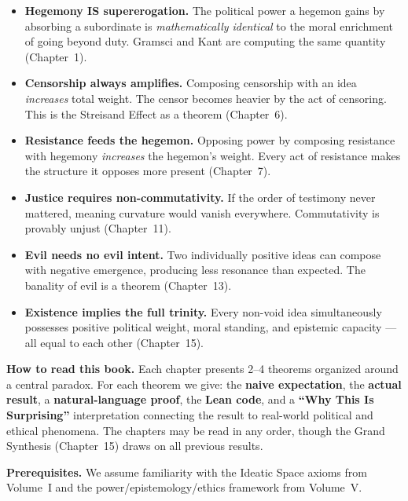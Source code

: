 \documentclass[11pt,openany]{book}
\theoremstyle{definition}
\theoremstyle{plain}
\theoremstyle{remark}
\begin{document}
\begin{itemize}
\item \textbf{Hegemony IS supererogation.} The political power a hegemon gains by absorbing a subordinate is \emph{mathematically identical} to the moral enrichment of going beyond duty.  Gramsci and Kant are computing the same quantity (Chapter~1).

\item \textbf{Censorship always amplifies.}  Composing censorship with an idea \emph{increases} total weight.  The censor becomes heavier by the act of censoring.  This is the Streisand Effect as a theorem (Chapter~6).

\item \textbf{Resistance feeds the hegemon.}  Opposing power by composing resistance with hegemony \emph{increases} the hegemon's weight.  Every act of resistance makes the structure it opposes more present (Chapter~7).

\item \textbf{Justice requires non-commutativity.}  If the order of testimony never mattered, meaning curvature would vanish everywhere.  Commutativity is provably unjust (Chapter~11).

\item \textbf{Evil needs no evil intent.}  Two individually positive ideas can compose with negative emergence, producing less resonance than expected.  The banality of evil is a theorem (Chapter~13).

\item \textbf{Existence implies the full trinity.}  Every non-void idea simultaneously possesses positive political weight, moral standing, and epistemic capacity --- all equal to each other (Chapter~15).
\end{itemize}

\noindent\textbf{How to read this book.} Each chapter presents 2--4 theorems organized around a central paradox.  For each theorem we give: the \textbf{naive expectation}, the \textbf{actual result}, a \textbf{natural-language proof}, the \textbf{Lean code}, and a \textbf{``Why This Is Surprising''} interpretation connecting the result to real-world political and ethical phenomena.  The chapters may be read in any order, though the Grand Synthesis (Chapter~15) draws on all previous results.

\bigskip

\noindent\textbf{Prerequisites.}  We assume familiarity with the Ideatic Space axioms from Volume~I and the power/epistemology/ethics framework from Volume~V.
\end{document}
